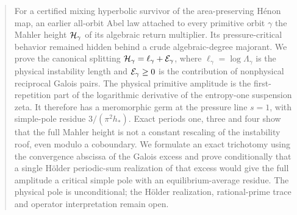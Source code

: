 \begin{abstract}
For a certified mixing hyperbolic survivor of the area-preserving H\'enon map,
an earlier all-orbit Abel law attached to every primitive orbit \(\gamma\) the
Mahler height \(\Hspec_\gamma\) of its algebraic return multiplier.  Its
pressure-critical behavior remained hidden behind a crude algebraic-degree
majorant.  We prove the canonical splitting
\(\Hspec_\gamma=\ell_\gamma+\Egal_\gamma\), where
\(\ell_\gamma=\log\Lambda_\gamma\) is the physical instability length and
\(\Egal_\gamma\ge0\) is the contribution of nonphysical reciprocal Galois
pairs.  The physical primitive amplitude is the first-repetition part of the
logarithmic derivative of the entropy-one suspension zeta.  It therefore has
a meromorphic germ at the pressure line \(s=1\), with simple-pole residue
\(3/(\pi^2h_*)\).  Exact periods one, three and four show that the full Mahler
height is not a constant rescaling of the instability roof, even modulo a
coboundary.  We formulate an exact trichotomy using the convergence abscissa
of the Galois excess and prove conditionally that a single H\"older
periodic-sum realization of that excess would give the full amplitude a
critical simple pole with an equilibrium-average residue.  The physical pole
is unconditional; the H\"older realization, rational-prime trace and operator
interpretation remain open.
\end{abstract}
